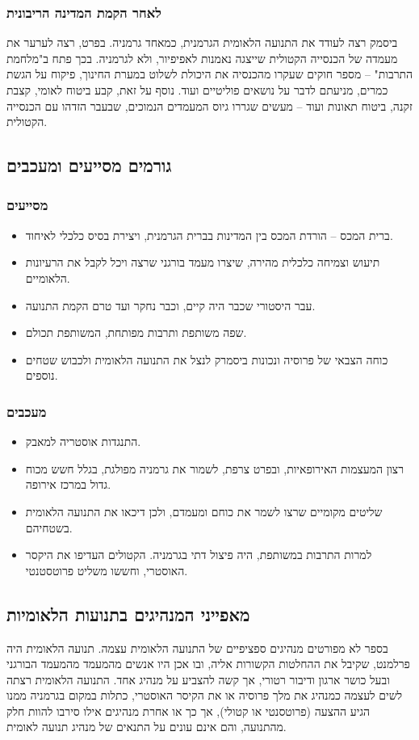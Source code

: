 \documentclass[]{article}
\begin{document}
	\subsubsection{לאחר הקמת המדינה הריבונית}
	ביסמק רצה לעודד את התנועה הלאומית הגרמנית, כמאחד גרמניה. בפרט, רצה לערער את מעמדה של הכנסייה הקטולית שייצגה נאמנות לאפיפיור, ולא לגרמניה. בכך פתח ב"מלחמת התרבות" – מספר חוקים שעקרו מהכנסיה את היכולת לשלוט במערת החינוך, פיקוח על הגשת כמרים, מניעתם לדבר על נושאים פוליטיים ועוד. נוסף על זאת, קבע ביטוח לאומי, קצבת זקנה, ביטוח תאונות ועוד – מעשים שגררו גיוס המעמדים הנמוכים, שבעבר הזדהו עם הכנסייה הקטולית. 
	
	\subsection{גורמים מסייעים ומעכבים}
	\subsubsection{מסייעים}
	\begin{itemize}
		\item ברית המכס – הורדת המכס בין המדינות בברית הגרמנית, ויצירת בסיס כלכלי לאיחוד. 
		\item תיעוש וצמיחה כלכלית מהירה, שיצרו מעמד בורגני שרצה ויכל לקבל את הרעיונות הלאומיים. 
		\item עבר היסטורי שכבר היה קיים, וכבר נחקר ועד טרם הקמת התנועה. 
		\item שפה משותפת ותרבות מפותחת, המשותפת תכולם. 
		\item כוחה הצבאי של פרוסיה ונכונות ביסמרק לנצל את התנועה הלאומית ולכבוש שטחים נוספים. 
	\end{itemize}
	\subsubsection{מעכבים}
	\begin{itemize}
		\item התנגדות אוסטריה למאבק. 
		\item רצון המעצמות האירופאיות, ובפרט צרפת, לשמור את גרמניה מפולגת, בגלל חשש מכוח גדול במרכז אירופה. 
		\item שליטים מקומיים שרצו לשמר את כוחם ומעמדם, ולכן דיכאו את התנועה הלאומית בשטחיהם. 
		\item למרות התרבות במשותפת, היה פיצול דתי בגרמניה. הקטולים העדיפו את היקסר האוסטרי, וחששו משליט פרוטסטנטי. 
	\end{itemize}
	
	\subsection{מאפייני המנהיגים בתנועות הלאומיות}
	בספר לא מפורטים מנהיגים ספציפיים של התנועה הלאומית עצמה. תנועה הלאומית היה פרלמנט, שקיבל את ההחלטות הקשורות אליה, ובו אכן היו אנשים מהמעמד מהמעמד הבורגני ובעל כושר ארגון ודיבור רטורי, אך קשה להצביע על מנהיג אחד. התנועה הלאומית רצתה לשים לעצמה כמנהיג את מלך פרוסיה או את הקיסר האוסטרי, כתלות במקום בגרמניה ממנו הגיע ההצעה (פרוטסנטי או קטולי), אך כך או אחרת מנהיגים אילו סירבו להוות חלק מהתנועה, והם אינם עונים על התנאים של מנהיג תנועה לאומית.
	
\end{document}
